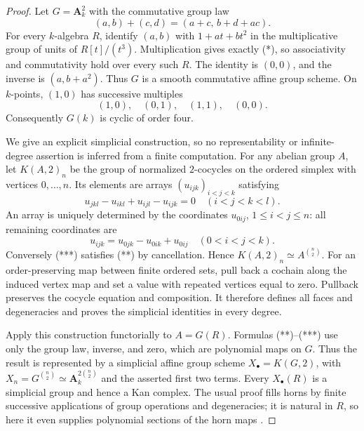 \begin{proof}
Let \(G=\mathbf A_k^2\) with the commutative group law
\[
 (a,b)+(c,d)=(a+c,\,b+d+ac).
 \tag{*}
\]
For every \(k\)-algebra \(R\), identify \((a,b)\) with
\(1+at+bt^2\) in the multiplicative group of units of \(R[t]/(t^3)\).
Multiplication gives exactly (*), so associativity and commutativity hold
over every such \(R\).  The identity is \((0,0)\), and the inverse is
\((a,b+a^2)\).  Thus \(G\) is a smooth commutative affine group scheme.
On \(k\)-points, \((1,0)\) has successive multiples
\[
 (1,0),\quad(0,1),\quad(1,1),\quad(0,0).
\]
Consequently \(G(k)\) is cyclic of order four.

We give an explicit simplicial construction, so no representability or
infinite-degree assertion is inferred from a finite computation.  For any
abelian group \(A\), let \(K(A,2)_n\) be the group of normalized
\(2\)-cocycles on the ordered simplex with vertices \(0,\ldots,n\).
Its elements are arrays \((u_{ijk})_{i<j<k}\) satisfying
\[
 u_{jkl}-u_{ikl}+u_{ijl}-u_{ijk}=0
 \quad(i<j<k<l).
 \tag{**}
\]
An array is uniquely determined by the coordinates
\(u_{0ij}\), \(1\leq i<j\leq n\): all remaining coordinates are
\[
 u_{ijk}=u_{0jk}-u_{0ik}+u_{0ij}\quad(0<i<j<k).
 \tag{***}
\]
Conversely (***) satisfies (**) by cancellation.  Hence
\(K(A,2)_n\simeq A^{\binom n2}\).
For an order-preserving map between finite ordered sets, pull back a
cochain along the induced vertex map and set a value with repeated
vertices equal to zero.  Pullback preserves the cocycle equation and
composition.  It therefore defines all faces and degeneracies and proves
the simplicial identities in every degree.

Apply this construction functorially to \(A=G(R)\).  Formulas (**)--(***)
use only the group law, inverse, and zero, which are polynomial maps on
\(G\).  Thus the result is represented by a simplicial affine group scheme
\(X_\bullet=K(G,2)\), with
\(X_n=G^{\binom n2}\simeq\mathbf A_k^{2\binom n2}\) and the asserted
first two terms.  Every \(X_\bullet(R)\) is a simplicial group and hence a
Kan complex.  The usual proof fills horns by finite successive
applications of group operations and degeneracies; it is natural in
\(R\), so here it even supplies polynomial sections of the horn maps
\cite[Tag~08NZ]{A567_StacksSimplicial}.


\end{proof}
